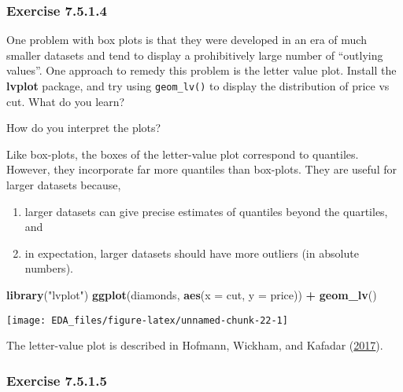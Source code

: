 \documentclass[]{book}
\newenvironment{Shaded}{\begin{snugshade}}{\end{snugshade}}
\newcommand{\DataTypeTok}[1]{\textcolor[rgb]{0.13,0.29,0.53}{#1}}
\newcommand{\KeywordTok}[1]{\textcolor[rgb]{0.13,0.29,0.53}{\textbf{#1}}}
\newcommand{\NormalTok}[1]{#1}
\newcommand{\OperatorTok}[1]{\textcolor[rgb]{0.81,0.36,0.00}{\textbf{#1}}}
\newcommand{\StringTok}[1]{\textcolor[rgb]{0.31,0.60,0.02}{#1}}
\providecommand{\tightlist}{%
  \setlength{\itemsep}{0pt}\setlength{\parskip}{0pt}}
\theoremstyle{plain}
\theoremstyle{remark}
\begin{document}
\hypertarget{exercise-7.5.1.4}{%
\subsubsection*{\texorpdfstring{Exercise
{7.5.1.4}}{Exercise 7.5.1.4}}\label{exercise-7.5.1.4}}

One problem with box plots is that they were developed in an era of much
smaller datasets and tend to display a prohibitively large number of
``outlying values''. One approach to remedy this problem is the letter
value plot. Install the \textbf{lvplot} package, and try using
\texttt{geom\_lv()} to display the distribution of price vs cut. What do
you learn?

How do you interpret the plots?

Like box-plots, the boxes of the letter-value plot correspond to
quantiles. However, they incorporate far more quantiles than box-plots.
They are useful for larger datasets because,

\begin{enumerate}
\def\labelenumi{\arabic{enumi}.}
\tightlist
\item
  larger datasets can give precise estimates of quantiles beyond the
  quartiles, and
\item
  in expectation, larger datasets should have more outliers (in absolute
  numbers).
\end{enumerate}

\begin{Shaded}
\begin{Highlighting}[]
\KeywordTok{library}\NormalTok{(}\StringTok{"lvplot"}\NormalTok{)}
\KeywordTok{ggplot}\NormalTok{(diamonds, }\KeywordTok{aes}\NormalTok{(}\DataTypeTok{x =}\NormalTok{ cut, }\DataTypeTok{y =}\NormalTok{ price)) }\OperatorTok{+}
\StringTok{  }\KeywordTok{geom_lv}\NormalTok{()}
\end{Highlighting}
\end{Shaded}

\begin{center}\texttt{[image: EDA\_files/figure-latex/unnamed-chunk-22-1]} \end{center}

The letter-value plot is described in Hofmann, Wickham, and Kafadar
(\protect\hyperlink{ref-HofmannWickhamKafadar2017}{2017}).

\hypertarget{exercise-7.5.1.5}{%
\subsubsection*{\texorpdfstring{Exercise
{7.5.1.5}}{Exercise 7.5.1.5}}\label{exercise-7.5.1.5}}
\end{document}
